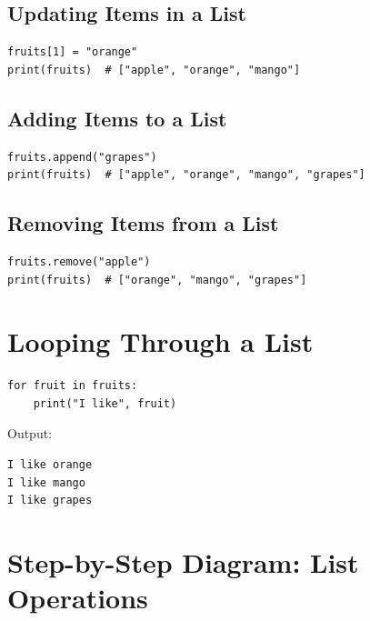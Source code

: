 \subsection{Updating Items in a List}

\begin{verbatim}
fruits[1] = "orange"
print(fruits)  # ["apple", "orange", "mango"]
\end{verbatim}

\subsection{Adding Items to a List}

\begin{verbatim}
fruits.append("grapes")
print(fruits)  # ["apple", "orange", "mango", "grapes"]
\end{verbatim}

\subsection{Removing Items from a List}

\begin{verbatim}
fruits.remove("apple")
print(fruits)  # ["orange", "mango", "grapes"]
\end{verbatim}

\section{Looping Through a List}

\begin{verbatim}
for fruit in fruits:
    print("I like", fruit)
\end{verbatim}

Output:

\begin{verbatim}
I like orange
I like mango
I like grapes
\end{verbatim}

\section{Step-by-Step Diagram: List Operations}

\begin{center}
\end{center}

